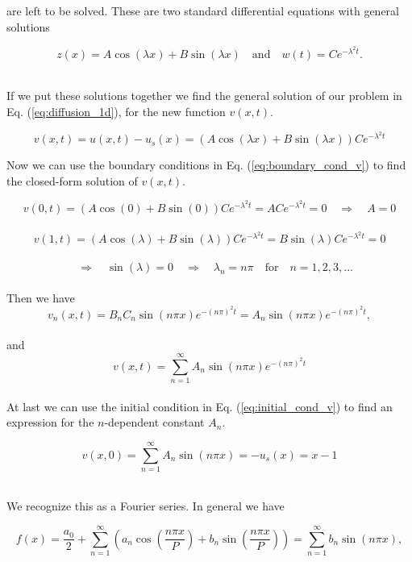\documentclass[12pt]{article}
\begin{document}
\begin{flushleft}
are left to be solved. These are two standard differential equations with general solutions

\vspace{5mm}
$$z(x) = A\cos(\lambda x) + B\sin(\lambda x)\quad\text{and}\quad w(t) = Ce^{-\lambda^2 t}.$$\\
\vspace{5mm}

If we put these solutions together we find the general solution of our problem in Eq. (\ref{eq:diffusion_1d}), for the new function $v(x,t)$.

\vspace{5mm}
\begin{equation}
v(x,t) = u(x,t) - u_s(x) = \left(A\cos(\lambda x) + B\sin(\lambda x)\right)Ce^{-\lambda^2 t}
\end{equation}
\vspace{5mm}

Now we can use the boundary conditions in Eq. (\ref{eq:boundary_cond_v}) to find the closed-form solution of $v(x,t)$.

\vspace{5mm}
$$v(0,t) = \left(A\cos(0) + B\sin(0)\right)Ce^{-\lambda^2 t} = ACe^{-\lambda^2 t} = 0 \quad\Rightarrow\quad A = 0$$\\
$$v(1,t) = \left(A\cos(\lambda) + B\sin(\lambda)\right)Ce^{-\lambda^2 t} = B\sin(\lambda)Ce^{-\lambda^2 t} = 0$$\\
$$\quad\Rightarrow\quad \sin(\lambda) = 0 \quad\Rightarrow\quad \lambda_n = n\pi\quad\text{for}\quad n = 1,2,3,...$$\\
\vspace{5mm}
Then we have 
\vspace{5mm}
$$v_n(x,t) = B_nC_n\sin(n\pi x)e^{-(n\pi)^2t} = A_n\sin(n\pi x)e^{-(n\pi)^2t},$$\\
and
$$v(x,t) = \sum\limits_{n=1}^{\infty}A_n\sin(n\pi x)e^{-(n\pi)^2t}$$\\
\vspace{5mm}
At last we can use the initial condition in Eq. (\ref{eq:initial_cond_v}) to find an expression for the $n$-dependent constant $A_n$.

\vspace{5mm}
$$v(x,0) = \sum\limits_{n=1}^{\infty}A_n\sin(n\pi x) = -u_s(x) = x-1$$\\
\vspace{5mm}

We recognize this as a Fourier series. In general we have

\vspace{5mm}
\begin{equation}\label{eq:fourier_series}
f(x) = \frac{a_0}{2}+\sum\limits_{n=1}^{\infty}\left(a_n\cos\left(\frac{n\pi x}{P}\right) + b_n\sin\left(\frac{n\pi x}{P}\right)\right) = \sum\limits_{n=1}^{\infty}b_n \sin\left(n\pi x\right),
\end{equation}
\vspace{5mm}


\end{flushleft}
\end{document}
